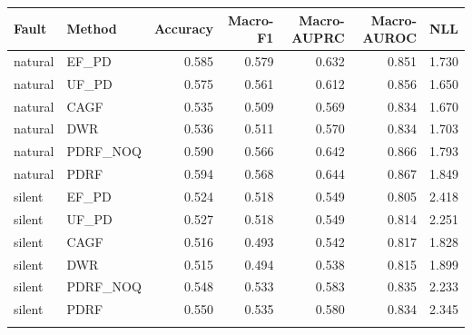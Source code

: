 \begin{tabular}{llrrrrr}
\toprule
Fault & Method & Accuracy & Macro-F1 & Macro-AUPRC & Macro-AUROC & NLL\\
\midrule
natural & EF\_PD & 0.585 & 0.579 & 0.632 & 0.851 & 1.730\\
natural & UF\_PD & 0.575 & 0.561 & 0.612 & 0.856 & 1.650\\
natural & CAGF & 0.535 & 0.509 & 0.569 & 0.834 & 1.670\\
natural & DWR & 0.536 & 0.511 & 0.570 & 0.834 & 1.703\\
natural & PDRF\_NOQ & 0.590 & 0.566 & 0.642 & 0.866 & 1.793\\
natural & PDRF & 0.594 & 0.568 & 0.644 & 0.867 & 1.849\\
\addlinespace
silent & EF\_PD & 0.524 & 0.518 & 0.549 & 0.805 & 2.418\\
silent & UF\_PD & 0.527 & 0.518 & 0.549 & 0.814 & 2.251\\
silent & CAGF & 0.516 & 0.493 & 0.542 & 0.817 & 1.828\\
silent & DWR & 0.515 & 0.494 & 0.538 & 0.815 & 1.899\\
silent & PDRF\_NOQ & 0.548 & 0.533 & 0.583 & 0.835 & 2.233\\
silent & PDRF & 0.550 & 0.535 & 0.580 & 0.834 & 2.345\\
\addlinespace
\bottomrule
\end{tabular}
